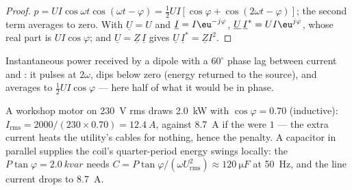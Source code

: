\begin{proof}
$p = UI\cos\omega t\cos(\omega t - \varphi) = \tfrac12 UI[\cos\varphi +
\cos(2\omega t - \varphi)]$; the second term averages to zero. With
$\underline U = U$ and $\underline I = I\eu^{-j\varphi}$,
$\underline U\,\underline I^* = UI\eu^{j\varphi}$, whose real part is
$UI\cos\varphi$; and $\underline U = \underline Z\,\underline I$ gives
$\underline U\,\underline I^* = \underline Z I^2$.
\end{proof}

\begin{omfigure}

{\small Instantaneous power received by a dipole with a $60^\circ$ phase
lag between current and : it pulses at $2\omega$, dips below zero
(energy returned to the source), and averages to $\tfrac12 UI\cos\varphi$
--- here half of what it would be in phase.}
\end{omfigure}

\begin{example}\label{ex:b1:sinusoidal-impedance:pf}
A workshop motor on \qty{230}{V} rms draws \qty{2.0}{kW} with
$\cos\varphi = 0.70$ (inductive): $I_{\mathrm{rms}} = 2000/(230 \times
0.70) = \qty{12.4}{A}$, against \qty{8.7}{A} if the  were
$1$ --- the extra current heats the utility's cables for nothing, hence
the penalty. A capacitor in parallel supplies the coil's quarter-period
energy swings locally: the \emph{} $P\tan\varphi =
\qty{2.0}{kvar}$ needs $C = P\tan\varphi/(\omega U_{\mathrm{rms}}^2)
\approx \qty{120}{\micro F}$ at \qty{50}{Hz}, and the line current drops
to \qty{8.7}{A}.
\end{example}

